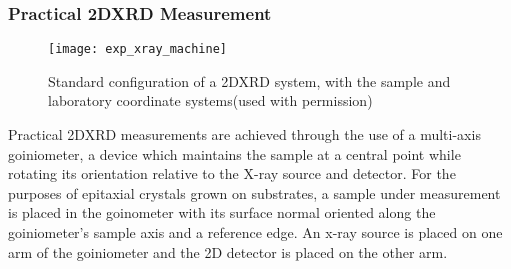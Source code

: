\subsubsection{Practical 2DXRD Measurement}
\begin{figure}
    \centering
    \texttt{[image: exp\_xray\_machine]}
    \caption[Typical 2DXRD experimental implementation]{\label{fig:exp_xray_machine}Standard configuration of a 2DXRD system, with the sample and laboratory coordinate systems\cite{He2009}(used with permission)}
\end{figure}
Practical 2DXRD measurements are achieved through the use of a multi-axis goiniometer, a device which maintains the sample at a central point while rotating its orientation relative to the X-ray source and detector. For the purposes of epitaxial crystals grown on substrates, a sample under measurement is placed in the goinometer with its surface normal oriented along the goiniometer's sample axis and a reference edge. An x-ray source is placed on one arm of the goiniometer and the 2D detector is placed on the other arm.


